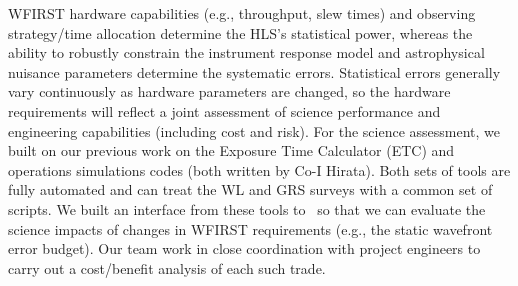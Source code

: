 WFIRST hardware capabilities (e.g., throughput, slew times) and observing
strategy/time allocation determine the HLS's statistical power, whereas the
ability to robustly constrain the instrument response model and astrophysical
nuisance parameters determine the systematic errors. Statistical errors
generally vary continuously as hardware parameters are changed, so the hardware
requirements will reflect a joint assessment of science performance and
engineering capabilities (including cost and risk). For the science assessment,
we built on our previous work on the Exposure Time Calculator (ETC) and
operations simulations codes (both written by Co-I Hirata).  Both sets of tools
are fully automated and can treat the WL and GRS surveys with a common set of
scripts. We built an interface from these tools to \CoLi\ so that
we can evaluate the science impacts of changes in WFIRST requirements (e.g., the
static wavefront error budget). Our team  work in close coordination with
project engineers to carry out a cost/benefit analysis of each such trade.


